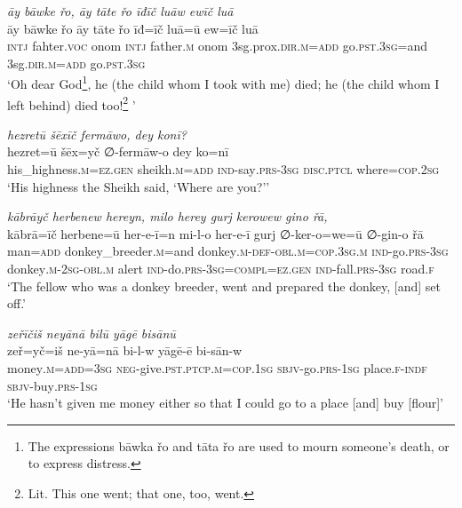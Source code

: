 \ea \label{ZQ.32}
\textit{āy bāwke řo, āy tāte řo īđīč luāw ewīč luā} \\ 
\gll āy bāwke řo āy tāte řo īđ=īč luā=ū ew=īč luā \\ 
 \textsc{intj} fahter.\textsc{voc} onom \textsc{intj} father\textsc{.m} onom 3sg.prox\textsc{.dir}\textsc{.m}\textsc{=add} go\textsc{.pst}\textsc{.3sg}=and 3sg\textsc{.dir}\textsc{.m}\textsc{=add} go\textsc{.pst}\textsc{.3sg} \\ 
\glt `Oh dear God\footnote{The expressions bāwka řo and tāta řo are used to mourn someone’s death, or to express distress.}, he (the child whom I took with me) died; he (the child whom I left behind) died too!\footnote{Lit. This one went; that one, too, went.} '
\z 
 
\ea \label{HB.6}
\textit{hezretū šēxīč fermāwo, dey konī?} \\ 
\gll hezret=ū šēx=yč ∅-fermāw-o dey ko=nī \\ 
 his\_highness\textsc{.m}\textsc{=ez}\textsc{.gen} sheikh\textsc{.m}\textsc{=add} \textsc{ind-}say\textsc{.prs}\textsc{-3sg} \textsc{disc.ptcl} where\textsc{=cop}\textsc{.\textsc{2sg}} \\ 
\glt `His highness the Sheikh said, ‘Where are you?’'
\z 
 
\ea \label{HB.15}
\textit{kābrāyč herbenew hereyn, milo herey gurj kerowew gino řā,} \\ 
\gll kābrā=īč herbene=ū her-e-ī=n mi-l-o her-e-ī gurj ∅-ker-o=we=ū ∅-gin-o řā \\ 
 man\textsc{=add} donkey\_breeder\textsc{.m}=and donkey\textsc{.m}\textsc{-def}\textsc{-obl}\textsc{.m}\textsc{=cop}\textsc{.3sg}\textsc{.m} \textsc{ind-}go\textsc{.prs}\textsc{-3sg} donkey\textsc{.m}-\textsc{2sg}\textsc{-obl}\textsc{.m} alert \textsc{ind-}do\textsc{.prs}\textsc{-3sg}\textsc{=\textsc{compl}}\textsc{=ez}\textsc{.gen} \textsc{ind-}fall\textsc{.prs}\textsc{-3sg} road\textsc{\textsc{.f}} \\ 
\glt `The fellow who was a donkey breeder, went and prepared the donkey, [and] set off.'
\z 
 
\ea \label{HB.22}
\textit{zeřīčiš neyānā bilū yāgē bisānū} \\ 
\gll zeř=yč=iš ne-yā=nā bi-l-w yāgē-ē bi-sān-w \\ 
 money\textsc{.m}\textsc{=add}\textsc{=3sg} \textsc{neg-}give\textsc{.pst}\textsc{.ptcp}\textsc{.m}\textsc{=cop}\textsc{.1sg} \textsc{sbjv-}go\textsc{.prs}\textsc{-1sg} place\textsc{\textsc{.f}}\textsc{-indf} \textsc{sbjv-}buy\textsc{.prs}\textsc{-1sg} \\ 
\glt `He hasn’t given me money either so that I could go to a place [and] buy [flour]'
\z 
 

